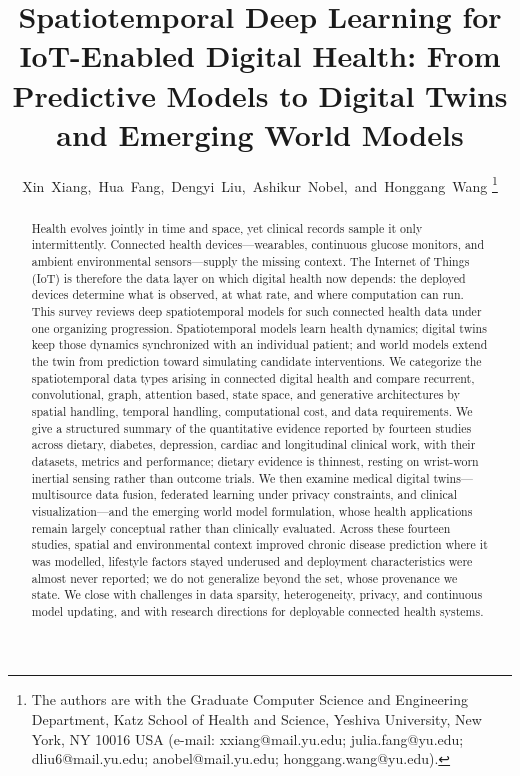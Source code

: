 \documentclass[journal]{IEEEtran}
\begin{document}
\title{Spatiotemporal Deep Learning for IoT-Enabled Digital Health: From Predictive Models to Digital Twins and Emerging World Models}

\author{Xin~Xiang,~Hua~Fang,~Dengyi~Liu,~Ashikur~Nobel,~and~Honggang~Wang%
\thanks{The authors are with the Graduate Computer Science and Engineering Department, Katz School of Health and Science, Yeshiva University, New York, NY 10016 USA (e-mail: xxiang@mail.yu.edu; julia.fang@yu.edu; dliu6@mail.yu.edu; anobel@mail.yu.edu; honggang.wang@yu.edu).}}

\maketitle

\begin{abstract}
Health evolves jointly in time and space, yet clinical records sample it only intermittently. Connected health devices---wearables, continuous glucose monitors, and ambient environmental sensors---supply the missing context. The Internet of Things (IoT) is therefore the data layer on which digital health now depends: the deployed devices determine what is observed, at what rate, and where computation can run. This survey reviews deep spatiotemporal models for such connected health data under one organizing progression. Spatiotemporal models learn health dynamics; digital twins keep those dynamics synchronized with an individual patient; and world models extend the twin from prediction toward simulating candidate interventions. We categorize the spatiotemporal data types arising in connected digital health and compare recurrent, convolutional, graph, attention based, state space, and generative architectures by spatial handling, temporal handling, computational cost, and data requirements. We give a structured summary of the quantitative evidence reported by fourteen studies across dietary, diabetes, depression, cardiac and longitudinal clinical work, with their datasets, metrics and performance; dietary evidence is thinnest, resting on wrist-worn inertial sensing rather than outcome trials. We then examine medical digital twins---multisource data fusion, federated learning under privacy constraints, and clinical visualization---and the emerging world model formulation, whose health applications remain largely conceptual rather than clinically evaluated. Across these fourteen studies, spatial and environmental context improved chronic disease prediction where it was modelled, lifestyle factors stayed underused and deployment characteristics were almost never reported; we do not generalize beyond the set, whose provenance we state. We close with challenges in data sparsity, heterogeneity, privacy, and continuous model updating, and with research directions for deployable connected health systems.
\end{abstract}
\end{document}
